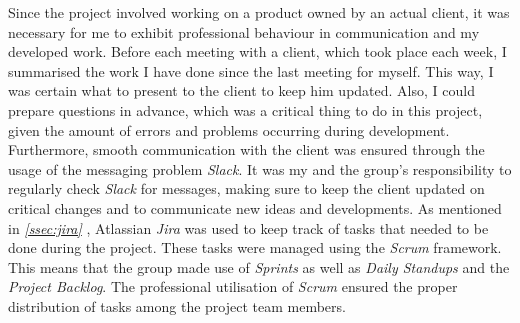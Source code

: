 Since the project involved working on a product owned by an actual client, it was necessary for me to exhibit professional behaviour in communication and my developed work. Before each meeting with a client, which took place each week, I summarised the work I have done since the last meeting for myself. This way, I was certain what to present to the client to keep him updated. Also, I could prepare questions in advance, which was a critical thing to do in this project, given the amount of errors and problems occurring during development.
\newline
Furthermore, smooth communication with the client was ensured through the usage of the messaging problem \textit{Slack}. It was my and the group's responsibility to regularly check \textit{Slack} for messages, making sure to keep the client updated on critical changes and to communicate new ideas and developments.
\newline
As mentioned in \textit{\ref{ssec:jira} }, Atlassian \textit{Jira} was used to keep track of tasks that needed to be done during the project. These tasks were managed using the \textit{Scrum} framework. This means that the group made use of \textit{Sprints} as well as \textit{Daily Standups} and the \textit{Project Backlog}. The professional utilisation of \textit{Scrum} ensured the proper distribution of tasks among the project team members.